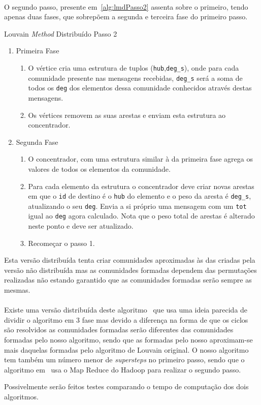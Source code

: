 \paragraph{}
O segundo passo, presente em~\ref{alg:lmdPasso2} assenta sobre o primeiro, tendo apenas duas fases, que sobrepõem a segunda e terceira fase do primeiro passo.

\begin{algorithm}
\caption{Louvain \textit{Method} Distribuído Passo 2}
\label{alg:lmdPasso2}
\begin{enumerate}
	\item Primeira Fase
	
	\begin{enumerate}
		\item O vértice cria uma estrutura de tuplos (\verb|hub|,\verb|deg_s|), onde para cada comunidade presente nas mensagens recebidas, \verb|deg_s| será a soma de todos os \verb|deg| dos elementos dessa comunidade conhecidos através destas mensagens.
		\item Os vértices removem as suas arestas e enviam esta estrutura ao concentrador.
	\end{enumerate}
	
	\item Segunda Fase
	
	
	\begin{enumerate}
		\item O concentrador, com uma estrutura similar à da primeira fase agrega os valores de todos os elementos da comunidade.
		\item Para cada elemento da estrutura o concentrador deve criar novas arestas em que o \verb|id| de destino é o \verb|hub| do elemento e o peso da aresta é \verb|deg_s|, atualizando o seu \verb|deg|. Envia a si próprio uma mensagem com um \verb|tot| igual ao \verb|deg| agora calculado. Nota que o peso total de arestas é alterado neste ponto e deve ser atualizado.
		\item Recomeçar o passo 1.
	\end{enumerate}
\end{enumerate}
\end{algorithm}

Esta versão distribuída tenta criar comunidades aproximadas às das criadas pela versão não distribuída mas as comunidades formadas dependem das permutações realizadas não estando garantido que as comunidades formadas serão sempre as mesmas.

\paragraph{}
Existe uma versão distribuída deste algoritmo~\cite{disLM} que usa uma ideia parecida de dividir o algoritmo em 3 fase mas devido a diferença na forma de que os ciclos são resolvidos as comunidades formadas serão diferentes das comunidades formadas pelo nosso algoritmo, sendo que as formadas pelo nosso aproximam-se mais daquelas formadas pelo algoritmo de Louvain original. O nosso algoritmo tem também um número menor de \textit{supersteps} no primeiro passo, sendo que o algoritmo em~\cite{disLM} usa o Map Reduce do Hadoop para realizar o segundo passo.

Possivelmente serão feitos testes comparando o tempo de computação dos dois algoritmos.
